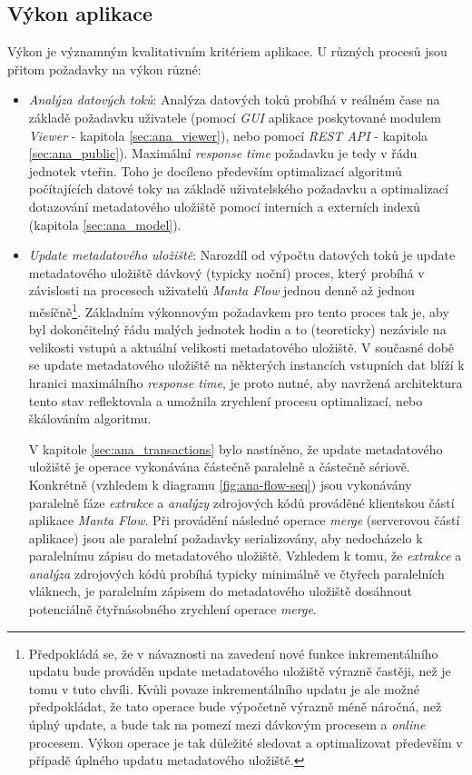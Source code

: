 \subsection{Výkon aplikace}
\label{sec:ana_performance}
Výkon je významným kvalitativním kritériem aplikace. U různých procesů jsou přitom požadavky na výkon různé:
\begin{itemize}
	\item{\textit{Analýza datových toků}}: Analýza datových toků probíhá v reálném čase na základě požadavku uživatele (pomocí \textit{GUI} aplikace poskytované modulem \textit{Viewer} - kapitola \ref{sec:ana_viewer}), nebo pomocí \textit{REST API} - kapitola \ref{sec:ana_public}). Maximální \textit{response time} požadavku je tedy v řádu jednotek vteřin. Toho je docíleno především optimalizací algoritmů počítajících datové toky na základě uživatelského požadavku a optimalizací dotazování metadatového uložiště pomocí interních a externích indexů (kapitola \ref{sec:ana_model}).

	\item{\textit{Update metadatového uložiště}}: Narozdíl od výpočtu datových toků je update metadatového uložiště dávkový (typicky noční) proces, který probíhá v závislosti na procesech uživatelů \textit{Manta Flow} jednou denně až jednou měsíčně\footnote{Předpokládá se, že v návaznosti na zavedení nové funkce inkrementálního updatu \cite{Sykora17} bude prováděn update metadatového uložiště výrazně častěji, než je tomu v tuto chvíli. Kvůli povaze inkrementálního updatu je ale možné předpokládat, že tato operace bude výpočetně výrazně méně náročná, než úplný update, a bude tak na pomezí mezi dávkovým procesem a \textit{online} procesem. Výkon operace je tak důležité sledovat a optimalizovat především v případě úplného updatu metadatového uložiště.}. Základním výkonnovým požadavkem pro tento proces tak je, aby byl dokončitelný řádu malých jednotek hodin a to (teoreticky) nezávisle na velikosti vstupů a aktuální velikosti metadatového uložiště. V současné době se update metadatového uložiště na některých instancích vstupních dat blíží k hranici maximálního \textit{response time}, je proto nutné, aby navržená architektura tento stav reflektovala a umožnila zrychlení procesu optimalizací, nebo škálováním algoritmu.

	V kapitole \ref{sec:ana_transactions} bylo nastíněno, že update metadatového uložiště je operace vykonávána částečně paralelně a částečně sériově. Konkrétně (vzhledem k diagramu \ref{fig:ana-flow-seq}) jsou vykonávány paralelně fáze \textit{extrakce} a \textit{analýzy} zdrojových kódů prováděné klientskou částí aplikace \textit{Manta Flow}. Při provádění následné operace \textit{merge} (serverovou částí aplikace) jsou ale paralelní požadavky serializovány, aby nedocházelo k paralelnímu zápisu do metadatového uložiště. Vzhledem k tomu, že \textit{extrakce} a \textit{analýza} zdrojových kódů probíhá typicky minimálně ve čtyřech paralelních vláknech, je paralelním zápisem do metadatového uložiště dosáhnout potenciálně čtyřnásobného zrychlení operace \textit{merge}.


\end{itemize}
